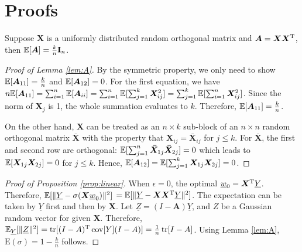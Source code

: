 \documentclass[appliedmath,article,accept,pdftex,moreauthors]{Definitions/mdpi}
\begin{document}
\section[\appendixname~\thesection]{Proofs}\label{sec:Proofs}
\begin{Lemma}\label{lem:A}
	Suppose $\bm{X}$ is a uniformly distributed random orthogonal matrix and $\bm{A} = \bm{X}\bm{X}^{\mathrm{T}}$,
	then $\mathbb{E}[\bm{A}] = \frac{k}{n} \mathbf{I}_n$.
\end{Lemma}
\begin{proof}[Proof of Lemma \ref{lem:A}]
By the symmetric property, we only need to show $\mathbb{E}[\bm{A}_{11}] = \frac{k}{n}$ and
$\mathbb{E}[\bm{A}_{12}] = 0$. For the first equation, we have $n\mathbb{E}[\bm{A}_{11}]
= \sum_{i=1}^n \mathbb{E}[\bm{A}_{ii}] = \sum_{i=1}^n \mathbb{E}[ \sum_{j=1}^k \bm{X}^2_{ij}] =
\sum_{j=1}^k \mathbb{E}[\sum_{i=1}^n \bm{X}^2_{ij}]$. Since the norm of $\bm{X}_j$ is 1,
the whole summation evaluates to $k$. Therefore, $\mathbb{E}[\bm{A}_{11}] = \frac{k}{n}$.

On the other hand, $\bm{X}$ can be treated as an $n\times k$ sub-block of an $n\times n$
random orthogonal matrix $\bm{\bar{X}}$ with the property that $\bm{X}_{ij} = \bm{\bar{X}}_{ij}$
for $j\leq k$. For $\bm{\bar{X}}$, the first and second row are orthogonal:
 $\mathbb{E}[\sum_{j=1}^n \bm{\bar{X}}_{1j}\bm{\bar{X}}_{2j}] = 0 $ which leads to
 $\mathbb{E}[\bm{X}_{1j}\bm{X}_{2j}] = 0$ for $j \leq k$. Hence, $\mathbb{E}[\bm{A}_{12}]=
 \mathbb{E}[\sum_{j=1}^k \bm{X}_{1j}\bm{X}_{2j}]=0$.
\end{proof}
\begin{proof}[Proof of Proposition \ref{prop:linear}]
    When $\epsilon = 0$, the optimal $\underline{w}_0 = \bm{X}^{\mathrm{T}}\underline{Y}$. Therefore,
    $\mathbb{E}[\lVert\underline{Y} - \sigma(\bm{X} \underline{w}_0)\rVert^2] $ $= \mathbb{E}[\lVert\underline{Y}-\bm{X}\bm{X}^{\mathrm{T}}\underline{Y}\rVert^2]$.
    The expectation can be taken by $\underline{Y}$ first and then by $\bm{X}$.
    Let $\underline{Z} = (I-\bm{A}) \underline{Y}$, and $Z$ be a Gaussian random vector
    for given $\bm{X}$. Therefore, $\mathbb{E}_{\underline{Y}}[\lVert\underline{Z}\rVert^2] = \operatorname*{tr}[(I-A)^{\mathrm{T}}\operatorname*{cov}[Y](I-A)]
    = \frac{1}{n}\operatorname*{tr}[I - A]$. Using Lemma \ref{lem:A}, $\mathrm{E}(\sigma) = 1 - \frac{k}{n}$ follows.
\end{proof}
\end{document}
